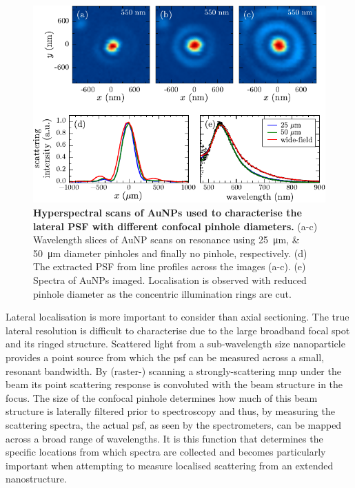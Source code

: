 \documentclass{article}
\begin{document}
\begin{figure}[bt]
\centering
\includegraphics{figures/lateral_aunp_scans}
\caption[Hyperspectral scans of AuNPs used to characterise the lateral PSF with different confocal pinhole diameters.]{\textbf{Hyperspectral scans of AuNPs used to characterise the lateral PSF with different confocal pinhole diameters.} (a-c) Wavelength slices of AuNP scans on resonance using \SIlist{25;50}{\micro\metre} diameter pinholes and finally no pinhole, respectively. (d) The extracted PSF from line profiles across the images (a-c). (e) Spectra of AuNPs imaged. Localisation is observed with reduced pinhole diameter as the concentric illumination rings are cut.}
\label{fig:lateral_psf}
\end{figure}

Lateral localisation is more important to consider than axial sectioning. {\color{red}The true lateral resolution is difficult to characterise due to the large broadband focal spot and its ringed structure.} Scattered light from a sub-wavelength size nanoparticle provides a point source from which the \gls{psf} can be measured across a small, resonant bandwidth. By (raster-) scanning a strongly-scattering \gls{mnp} under the beam its point scattering response is convoluted with the beam structure in the focus. The size of the confocal pinhole determines how much of this beam structure is laterally filtered prior to spectroscopy and thus, by measuring the scattering spectra, the actual \gls{psf}, as seen by the spectrometers, can be mapped across a broad range of wavelengths. It is this function that determines the specific locations from which spectra are collected and becomes particularly important when attempting to measure localised scattering from an extended nanostructure.
\end{document}
